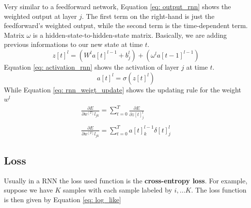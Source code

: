 \documentclass[11pt]{article}
\begin{document}
Very similar to a feedforward network, Equation \ref{eq: output_rnn} shows the weighted output at layer $j$. The first term on the right-hand is just the feedforward's weighted output, while the second term is the time-dependent term. Matrix $\omega$ is a hidden-state-to-hidden-state matrix. Basically, we are adding previous informations to our new state at time $t$.
\begin{equation}
z[t]^l = (W^la[t]^{l -1}+ b^l_j) + (\omega^l a[t-1]^{l-1})
\label{eq: output_rnn}	
\end{equation}
Equation \ref{eq: activation_rnn} shows the activation of layer $j$ at time $t$.
\begin{equation}
a[t]^l	= \sigma(z[t]^l)
\label{eq: activation_rnn}
\end{equation}
While Equation \ref{eq: rnn_weigt_update} shows the updating rule for the weight $w^l$
\begin{equation}
\begin{matrix}
\frac{\partial E}{\partial w^[T]l_{jk}} =\sum^T_{t=0} \frac{\partial E}{\partial z[t]^l_j}	\\ 
\\
\frac{\partial E}{\partial w^[T]l_{jk}} = \sum^T_{t=0} a[t]^{l-1}_k \delta[t]^l_j	
\end{matrix}
\label{eq: rnn_weigt_update}
\end{equation}
\subsection{Loss}
Usually in a RNN the loss used function is the \textbf{cross-entropy loss}. For example, suppose we have $K$ samples with each sample labeled by $i, ... K$. The loss function is then given by Equation \ref{eq: log_like}

 
\end{document}
